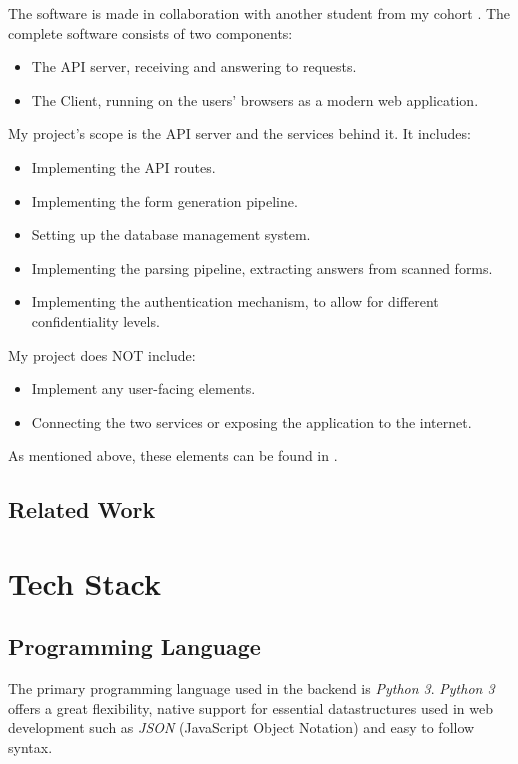 \documentclass[11pt, a4paper]{report}
\begin{document}
The software is made in collaboration with another student from my cohort \cite{felix}.
The complete software consists of two components:
\begin{itemize}
    \item The API server, receiving and answering to requests.
    \item The Client, running on the users' browsers as a modern web application.
\end{itemize}
My project's scope is the API server and the services behind it. It includes:
\begin{itemize}
    \item Implementing the API routes.
    \item Implementing the form generation pipeline.
    \item Setting up the database management system.
    \item Implementing the parsing pipeline, extracting answers from scanned forms.
    \item Implementing the authentication mechanism, to allow for different confidentiality levels.
\end{itemize}
My project does NOT include:
\begin{itemize}
    \item Implement any user-facing elements.
    \item Connecting the two services or exposing the application to the internet.
\end{itemize}
As mentioned above, these elements can be found in \cite{felix}.

\section{Related Work}


\chapter{Tech Stack}

\section{Programming Language}

The primary programming language used in the backend is \textit{Python 3}.
\textit{Python 3} offers a great flexibility, native support for essential datastructures used in web development such as \textit{JSON} (JavaScript Object Notation) and easy to follow syntax.
\end{document}
